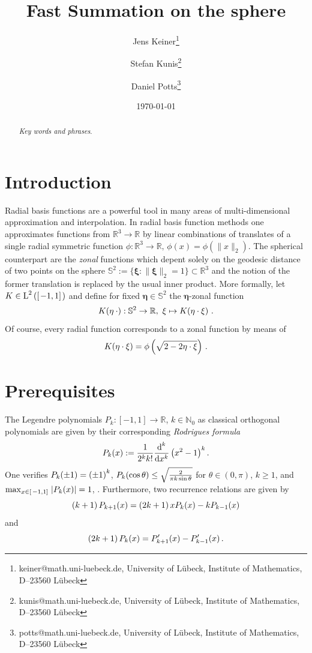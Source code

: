 \documentclass[11pt,a4paper,twoside,bibtotoc]{scrartcl}
\title{
Fast Summation on the sphere}
\date{\today}
\author{
Jens Keiner\thanks{keiner@math.uni-luebeck.de, University of
  L\"ubeck, Institute of Mathematics, D--23560 L\"ubeck} \and
Stefan Kunis\thanks{kunis@math.uni-luebeck.de, University of
  L\"ubeck, Institute of Mathematics, D--23560 L\"ubeck} \and
Daniel Potts\thanks{potts@math.uni-luebeck.de, University of
  L\"ubeck, Institute of Mathematics, D--23560 L\"ubeck} 
}
\theoremstyle{plain}
\theoremstyle{definition}
\theoremstyle{remark}
\newcommand{\N}{\ensuremath{\mathbb{N}}}
\newcommand{\R}{\ensuremath{\mathbb{R}}}
\newcommand{\abs}[1]{\ensuremath{\left\vert#1\right\vert}}
\newcommand{\twosphere}{\ensuremath{\mathbb{S}^2}}
\newcommand{\Ln}[2]{\ensuremath{\text{\rm{L}}^{#1}\left(#2\right)}}
\newcommand{\interv}[4]{\ensuremath{\left#1\left.#2,#3\right#4\right.}}
\newcommand{\fun}[2]{\ensuremath{#1{\hspace{-0.4ex}}\left(#2\right)}}
\newcommand{\paren}[1]{\ensuremath{\left(#1\right)}}
\newcommand{\mb}[1]{\mathbf{#1}}
\newcommand{\V}[1]{\mb{#1}}
\newcommand{\dx}{\text{\rm{d}}}
\numberwithin{equation}{section}
\numberwithin{table}{section}
\numberwithin{figure}{section}
\begin{document}
\maketitle

\begin{abstract}
\medskip


\noindent
{\it Key words and phrases}.  
\end{abstract}

\section{Introduction}
\label{sect:1}
Radial basis functions are a powerful tool in many areas of multi-dimensional 
approximation and interpolation.
In radial basis function methods one approximates functions from $\R^3
\rightarrow \R$ by linear combinations of translates of a single radial 
symmetric function $\phi:\R^3 \rightarrow \R, \, \phi(x)=\phi(\|x\|_2)$.
The spherical counterpart are the \emph{zonal} functions which depent solely
on the geodesic distance of two points on the sphere $\twosphere:=\{
\V{\xi}: \|\V{\xi}\|_2=1\} \subset \R^3$ and the notion of the former
translation is replaced by the usual inner product.
More formally, let $K \in \Ln{2}{\interv{[}{-1}{1}{]}}$ and define for fixed
$\V{\eta} \in \twosphere$ the $\V{\eta}$-zonal function 
\[
  \fun{K}{\V{\eta} \: \cdot}: \twosphere \rightarrow \R,\ \V{\xi} \mapsto
  \fun{K}{\V{\eta} \cdot \V{\xi}}\,.%
\]
Of course, every radial function corresponds to a zonal function by means of
\[
  \fun{K}{\V{\eta} \cdot \V{\xi}} = \phi\left(\sqrt{2-2\V{\eta} \cdot
  \V{\xi}}\right)\,.
\]

\section{Prerequisites}
\label{sect:2}
The Legendre polynomials $P_k : \interv{[}{-1}{1}{]} \rightarrow \R$, $k \in
\N_{0}$ as classical orthogonal polynomials are given by their corresponding
\emph{Rodrigues formula}
\[
\fun{P_k}{x} := \frac{1}{2^k k!} \frac{\dx^k}{\dx x^k} \paren{x^2-1}^k.
\]
One verifies $\fun{P_{k}}{\pm1} = \paren{\pm1}^{k}$, $\fun{P_{k}}{\cos\theta}
\le \sqrt{\frac{2}{\pi k \sin\theta}}$ for $\theta \in (0,\pi)$, $k \ge 1$, 
and $\max_{x \in \interv{[}{-1}{1}{]}} \abs{\fun{P_{k}}{x}} = 1$, 
\cite[pp. 47]{niuv}.
Furthermore, two recurrence relations are given by
\begin{equation}\label{three1}
\paren{k+1}\fun{P_{k+1}}{x} = \paren{2k+1}x\fun{P_{k}}{x} - k\fun{P_{k-1}}{x}
\end{equation}
and
\begin{equation}\label{three2}
\paren{2k+1} \fun{P_{k}}{x} = \fun{P_{k+1}'}{x} - \fun{P_{k-1}'}{x}.
\end{equation}
\end{document}
